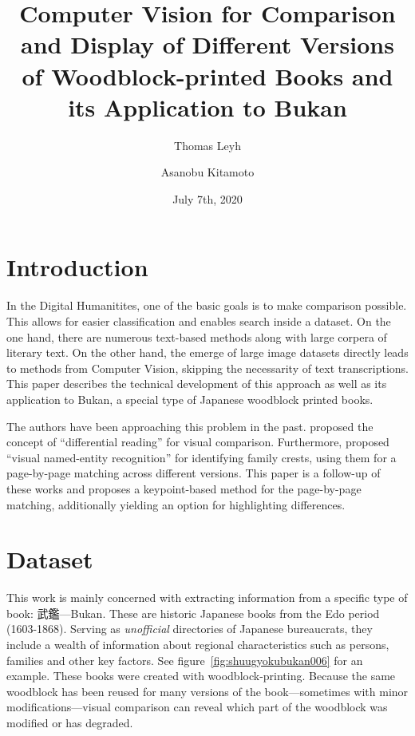 \documentclass{ltjarticle}
\title{Computer Vision for Comparison and Display of Different Versions of Woodblock-printed Books and its Application to Bukan}
\author[1,3]{Thomas Leyh}
\author[2,3]{Asanobu Kitamoto}
\affil[1]{University of Freiburg}
\affil[2]{ROIS-DS Center for Open Data in the Humanities}
\affil[3]{National Institute of Informatics}
\date{July 7th, 2020}
\begin{document}
\maketitle

\section{Introduction}

In the Digital Humanitites, one of the basic goals is to make comparison possible. This allows for easier classification and enables search inside a dataset. On the one hand, there are numerous text-based methods along with large corpera of literary text. On the other hand, the emerge of large image datasets directly leads to methods from Computer Vision, skipping the necessarity of text transcriptions. This paper describes the technical development of this approach as well as its application to Bukan, a special type of Japanese woodblock printed books.

The authors have been approaching this problem in the past. \cite{kitamoto2018} proposed the concept of “differential reading” for visual comparison. Furthermore, \cite{hakim2019} proposed “visual named-entity recognition” for identifying family crests, using them for a page-by-page matching across different versions. This paper is a follow-up of these works and proposes a keypoint-based method for the page-by-page matching, additionally yielding an option for highlighting differences. 

\section{Dataset}

This work is mainly concerned with extracting information from a specific type of book: 武鑑---Bukan. These are historic Japanese books from the Edo period (1603-1868). Serving as \emph{unofficial} directories of Japanese bureaucrats, they include a wealth of information about regional characteristics such as persons, families and other key factors. See figure~\ref{fig:shuugyokubukan006} for an example. These books were created with woodblock-printing. Because the same woodblock has been reused for many versions of the book---sometimes with minor modifications---visual comparison can reveal which part of the woodblock was modified or has degraded.
\end{document}
